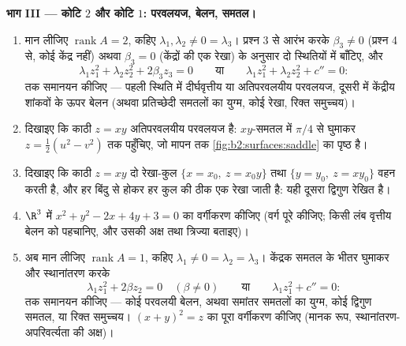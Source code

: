 \begin{problem}[{सप्ताहांत समस्या --- हर द्विघातज पृष्ठ,
वर्णक्रमीय प्रमेय से छाँटा हुआ}]
\medskip
\noindent\textbf{भाग III --- कोटि $2$ और कोटि $1$:
परवलयज, बेलन, समतल।}
\begin{enumerate}[resume]
  \item मान लीजिए $\operatorname{rank}A = 2$, कहिए $\lambda_1,
        \lambda_2 \neq 0 = \lambda_3$। प्रश्न 3 से आरंभ करके
        $\beta_3 \neq 0$ (प्रश्न 4 से, कोई केंद्र नहीं) अथवा $\beta_3 = 0$
        (केंद्रों की एक रेखा) के अनुसार दो स्थितियों में
        बाँटिए, और
        \[
        \lambda_1z_1^2 + \lambda_2z_2^2 + 2\beta_3z_3 = 0
        \qquad\text{या}\qquad
        \lambda_1z_1^2 + \lambda_2z_2^2 + c'' = 0 :
        \]
        तक समानयन कीजिए --- पहली स्थिति में दीर्घवृत्तीय या
        अतिपरवलयीय परवलयज, दूसरी में केंद्रीय शांकवों के ऊपर
        बेलन (अथवा प्रतिच्छेदी समतलों का युग्म, कोई रेखा,
        रिक्त समुच्चय)।
  \item दिखाइए कि काठी $z = xy$ अतिपरवलयीय परवलयज है: $xy$-समतल
        में $\pi/4$ से घुमाकर $z = \tfrac12(u^2 - v^2)$ तक पहुँचिए, जो मापन तक \cref{fig:b2:surfaces:saddle}
        का पृष्ठ है।
  \item दिखाइए कि काठी $z = xy$ दो रेखा-कुल $\{x = x_0,\ z = x_0y\}$ तथा $\{y = y_0,\ z
        = xy_0\}$ वहन
        करती है, और हर बिंदु से होकर हर कुल की ठीक एक रेखा
        जाती है: यही दूसरा द्विगुण रेखित  है।
  \item $\R^3$ में $x^2 + y^2 - 2x + 4y + 3 = 0$ का वर्गीकरण कीजिए (वर्ग पूरे कीजिए;
        किसी लंब वृत्तीय बेलन को पहचानिए, और उसकी अक्ष तथा
        त्रिज्या बताइए)।
  \item अब मान लीजिए $\operatorname{rank}A = 1$, कहिए $\lambda_1
        \neq 0 = \lambda_2 = \lambda_3$। केंद्रक समतल के भीतर
        घुमाकर और स्थानांतरण करके
        \[
        \lambda_1z_1^2 + 2\beta z_2 = 0 \quad (\beta \neq 0)
        \qquad\text{या}\qquad
        \lambda_1z_1^2 + c'' = 0 :
        \]
        तक समानयन कीजिए --- कोई परवलयी बेलन, अथवा समांतर समतलों
        का युग्म, कोई द्विगुण समतल, या रिक्त समुच्चय। $(x + y)^2 =
        z$ का
        पूरा वर्गीकरण कीजिए (मानक रूप, स्थानांतरण-अपरिवर्त्यता
        की अक्ष)।
\end{enumerate}


\end{problem}
